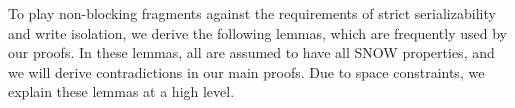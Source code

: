 
To play non-blocking fragments against the requirements of strict serializability and write isolation, we derive the following lemmas, which are frequently used by our proofs. In these lemmas, all \rots{} are assumed to have all SNOW properties, and we will derive contradictions in our main proofs. Due to space constraints, we explain these lemmas at a high level. %







